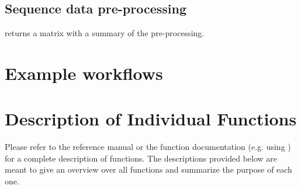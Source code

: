 \documentclass[12pt]{article}
\newcommand{\fasta}{\texttt{FASTA}}
\newcommand{\fastq}{\texttt{FASTQ}}
\begin{document}
\subsection{Sequence data pre-processing}
% 

 returns a matrix with a summary of the pre-processing. 

\newpage
\section{Example workflows}
\label{sec:exampleWorkflows}


\newpage
\section{Description of Individual  Functions}
Please refer to the  reference manual or the function documentation (e.g. using ) for a complete description of  functions. The descriptions provided below are meant to give an overview over all functions and summarize the purpose of each one.
\end{document}
